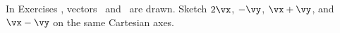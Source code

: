{\noin In Exercises}
{, vectors \vx\ and \vy\ are drawn. Sketch $2\vx$, $-\vy$, $\vx+\vy$, and $\vx-\vy$ on the same Cartesian axes.}

